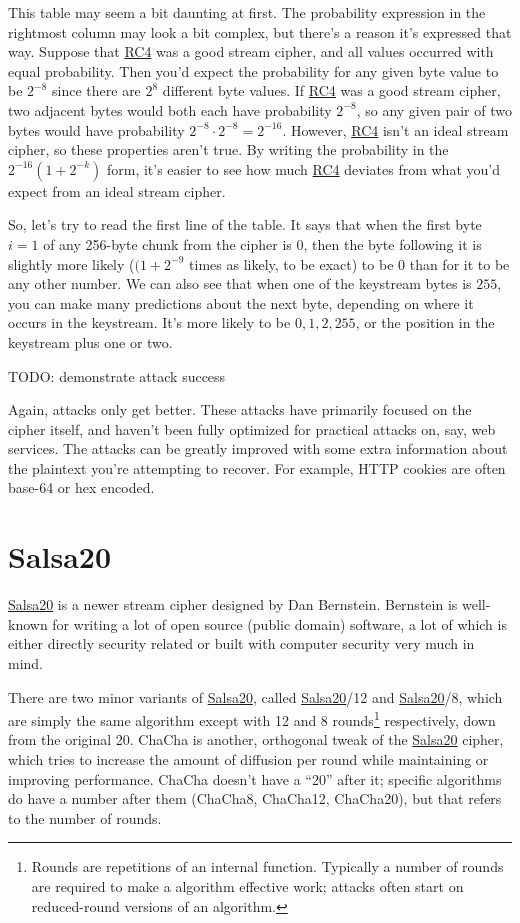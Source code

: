 \documentclass[11pt,ebook,table,dvipsnames]{memoir}
\begin{document}
This table may seem a bit daunting at first. The probability
expression in the rightmost column may look a bit complex, but there's
a reason it's expressed that way. Suppose that \hyperref[RC4]{RC4} was a good stream
cipher, and all values occurred with equal probability. Then you'd
expect the probability for any given byte value to be $2^{-8}$ since
there are $2^8$ different byte values. If \hyperref[RC4]{RC4} was a good stream
cipher, two adjacent bytes would both each have probability $2^{-8}$,
so any given pair of two bytes would have probability $2^{-8} \cdot
2^{-8} = 2^{-16}$. However, \hyperref[RC4]{RC4} isn't an ideal stream cipher, so these
properties aren't true. By writing the probability in the $2^{-16} (1 +
2^{-k})$ form, it's easier to see how much \hyperref[RC4]{RC4} deviates from what
you'd expect from an ideal stream cipher.

So, let's try to read the first line of the table. It says that when
the first byte $i = 1$ of any 256-byte chunk from the cipher is $0$,
then the byte following it is slightly more likely ($(1 + 2^{-9}$
times as likely, to be exact) to be 0 than for it to be any other
number. We can also see that when one of the keystream bytes is $255$,
you can make many predictions about the next byte, depending on where
it occurs in the keystream. It's more likely to be $0, 1, 2, 255$, or
the position in the keystream plus one or two.

TODO: demonstrate attack success

Again, attacks only get better. These attacks have primarily focused
on the cipher itself, and haven't been fully optimized for practical
attacks on, say, web services. The attacks can be greatly improved
with some extra information about the plaintext you're attempting to
recover. For example, HTTP cookies are often base-64 or hex encoded.
\section{\label{Salsa20}Salsa20}
\label{sec-2-3-12}

\hyperref[Salsa20]{Salsa20} is a newer \gls{stream cipher} designed by Dan Bernstein.
Bernstein is well-known for writing a lot of open source (public
domain) software, a lot of which is either directly security related
or built with computer security very much in mind.

There are two minor variants of \hyperref[Salsa20]{Salsa20}, called \hyperref[Salsa20]{Salsa20}/12 and
\hyperref[Salsa20]{Salsa20}/8, which are simply the same algorithm except with 12 and 8
rounds\footnote{Rounds are repetitions of an internal function. Typically a
number of rounds are required to make a algorithm effective work;
attacks often start on reduced-round versions of an algorithm.}
respectively, down from the original 20. ChaCha is another, orthogonal
tweak of the \hyperref[Salsa20]{Salsa20} cipher, which tries to increase the amount of
diffusion per round while maintaining or improving performance. ChaCha
doesn't have a \enquote{20} after it; specific algorithms do have a number
after them (ChaCha8, ChaCha12, ChaCha20), but that refers to the
number of rounds.
\end{document}
